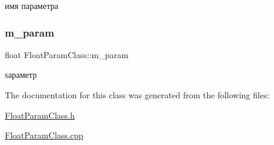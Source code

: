 имя параметра 

\mbox{\label{class_float_param_class_aa6dd385fb895519b12f6c7fe1bd0c6b5}} 
\subsubsection{\texorpdfstring{m\+\_\+param}{m\_param}}
{\footnotesize\ttfamily float Float\+Param\+Class\+::m\+\_\+param\hspace{0.3cm}{\ttfamily [private]}}



ѕараметр 



The documentation for this class was generated from the following files\+:\begin{DoxyCompactItemize}
\item 
\hyperlink{_float_param_class_8h}{Float\+Param\+Class.\+h}\item 
\hyperlink{_float_param_class_8cpp}{Float\+Param\+Class.\+cpp}\end{DoxyCompactItemize}

